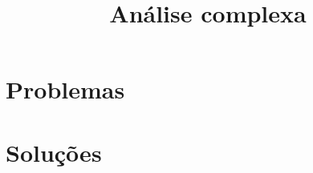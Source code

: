 \documentclass[brazilian,a4paper]{scrartcl}
\title{Análise complexa}
\begin{document}
\maketitle
\tableofcontents

\appendix
\newpage
\section{Problemas}

\newpage
\section{Soluções}

\end{document}
